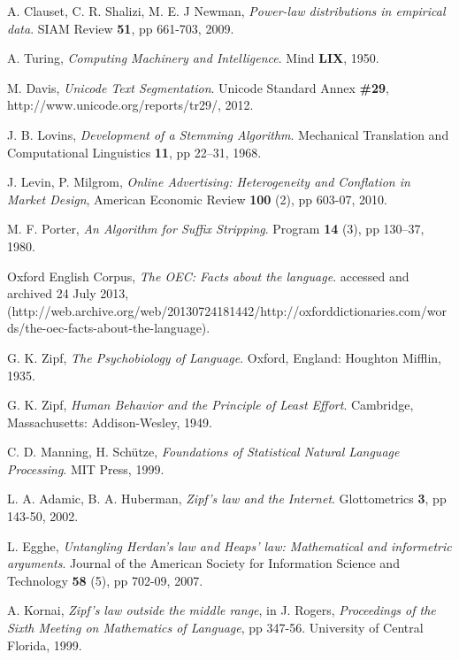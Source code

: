 \begin{thebibliography}{99}
  A. Clauset, C. R. Shalizi, M. E. J Newman,
  \emph{Power-law distributions in empirical data}.
  SIAM Review \textbf{51}, pp 661-703,
  2009.
  
  A. Turing,
  \emph{Computing Machinery and Intelligence}.
  Mind \textbf{LIX},
  1950.

  M. Davis,
  \emph{Unicode Text Segmentation}.
  Unicode Standard Annex \textbf{\#29}, http://www.unicode.org/reports/tr29/,
  2012.

  J. B. Lovins,
  \emph{Development of a Stemming Algorithm}.
  Mechanical Translation and Computational Linguistics \textbf{11}, pp 22–31,
  1968.

  J. Levin, P. Milgrom,
  \emph{Online Advertising: Heterogeneity and Conflation in Market Design},
  American Economic Review \textbf{100} (2), pp 603-07,
  2010.

  M. F. Porter,
  \emph{An Algorithm for Suffix Stripping}.
  Program \textbf{14} (3), pp 130–37,
  1980.

  Oxford English Corpus,
  \emph{The OEC: Facts about the language}.
  accessed and archived 24 July 2013, (http://web.archive.org/web/20130724181442/http://oxforddictionaries.com/words/the-oec-facts-about-the-language).

  G. K. Zipf,
  \emph{The Psychobiology of Language}.
  Oxford, England: Houghton Mifflin,
  1935.

  G. K. Zipf,
  \emph{Human Behavior and the Principle of Least Effort}.
  Cambridge, Massachusetts: Addison-Wesley,
  1949.

  C. D. Manning, H. Schütze,
  \emph{Foundations of Statistical Natural Language Processing}.
  MIT Press,
  1999.

  L. A. Adamic, B. A. Huberman,
  \emph{Zipf’s law and the Internet}.
  Glottometrics \textbf{3}, pp 143-50,
  2002.

  L. Egghe,
  \emph{Untangling Herdan's law and Heaps' law: Mathematical and informetric arguments}.
  Journal of the American Society for Information Science and Technology \textbf{58} (5), pp 702-09,
  2007.

  A. Kornai,
  \emph{Zipf's law outside the middle range}, in J. Rogers, \emph{Proceedings of the Sixth Meeting on Mathematics of Language}, pp 347-56.
  University of Central Florida,
  1999.


\end{thebibliography}
